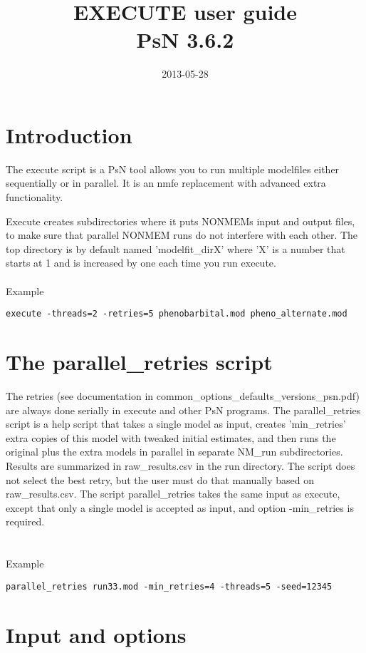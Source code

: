 \documentclass[a4paper,12pt]{article}
\title{EXECUTE user guide\\ \vspace{2 mm} {\large PsN 3.6.2}}
\date{2013-05-28}
\begin{document}
\maketitle


\section{Introduction}

The execute script is a PsN tool allows you to run multiple modelfiles either sequentially or in parallel. It is an nmfe replacement with advanced extra
functionality.

Execute creates subdirectories where it puts NONMEMs input and output files, to make sure that parallel NONMEM runs do not interfere with each other.
The top directory is by default named 'modelfit\_dirX' where 'X' is a number that starts at 1 and is increased by one each time you run execute.
\\
\\
Example
\begin{verbatim}
execute -threads=2 -retries=5 phenobarbital.mod pheno_alternate.mod
\end{verbatim}

\section{The parallel\_retries script}

The retries (see documentation in common\_options\_defaults\_versions\_psn.pdf) are always done serially in execute and other PsN programs. The parallel\_retries script is a help script that takes a single model as input, creates 'min\_retries' extra copies of this model with tweaked initial estimates, and then runs the original plus the extra models in parallel in separate NM\_run subdirectories. Results are summarized in raw\_results.csv in the run directory. The script does not select the best retry, but the user must do that manually based on raw\_results.csv. The script parallel\_retries takes the same input as execute, except that only a single model is accepted as input, and option -min\_retries is required. 
\\
\\
\\
Example
\begin{verbatim}
parallel_retries run33.mod -min_retries=4 -threads=5 -seed=12345
\end{verbatim}

\section{Input and options}
\end{document}
